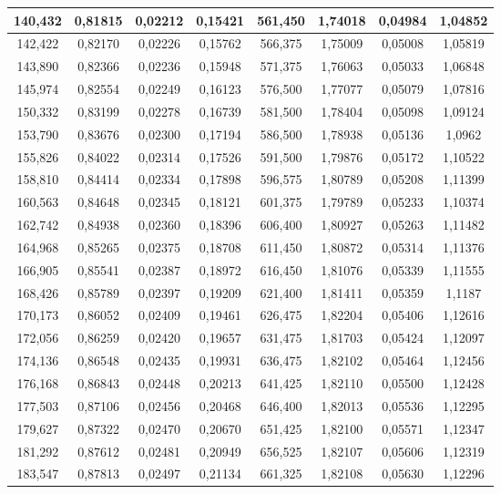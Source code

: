 \documentclass[a4paper,12pt]{article}
\numberwithin{equation}{section}
\begin{document}
\begin{appendices}
\begin{longtable}[c]{|c|c|c|c|c|c|c|c|}
140,432	&	0,81815	&	0,02212	&	0,15421	&	561,450	&	1,74018	&	0,04984	&	1,04852	\\\hline
142,422	&	0,82170	&	0,02226	&	0,15762	&	566,375	&	1,75009	&	0,05008	&	1,05819	\\\hline
143,890	&	0,82366	&	0,02236	&	0,15948	&	571,375	&	1,76063	&	0,05033	&	1,06848	\\\hline
145,974	&	0,82554	&	0,02249	&	0,16123	&	576,500	&	1,77077	&	0,05079	&	1,07816	\\\hline
150,332	&	0,83199	&	0,02278	&	0,16739	&	581,500	&	1,78404	&	0,05098	&	1,09124	\\\hline
153,790	&	0,83676	&	0,02300	&	0,17194	&	586,500	&	1,78938	&	0,05136	&	1,0962	\\\hline
155,826	&	0,84022	&	0,02314	&	0,17526	&	591,500	&	1,79876	&	0,05172	&	1,10522	\\\hline
158,810	&	0,84414	&	0,02334	&	0,17898	&	596,575	&	1,80789	&	0,05208	&	1,11399	\\\hline
160,563	&	0,84648	&	0,02345	&	0,18121	&	601,375	&	1,79789	&	0,05233	&	1,10374	\\\hline
162,742	&	0,84938	&	0,02360	&	0,18396	&	606,400	&	1,80927	&	0,05263	&	1,11482	\\\hline
164,968	&	0,85265	&	0,02375	&	0,18708	&	611,450	&	1,80872	&	0,05314	&	1,11376	\\\hline
166,905	&	0,85541	&	0,02387	&	0,18972	&	616,450	&	1,81076	&	0,05339	&	1,11555	\\\hline
168,426	&	0,85789	&	0,02397	&	0,19209	&	621,400	&	1,81411	&	0,05359	&	1,1187	\\\hline
170,173	&	0,86052	&	0,02409	&	0,19461	&	626,475	&	1,82204	&	0,05406	&	1,12616	\\\hline
172,056	&	0,86259	&	0,02420	&	0,19657	&	631,475	&	1,81703	&	0,05424	&	1,12097	\\\hline
174,136	&	0,86548	&	0,02435	&	0,19931	&	636,475	&	1,82102	&	0,05464	&	1,12456	\\\hline
176,168	&	0,86843	&	0,02448	&	0,20213	&	641,425	&	1,82110	&	0,05500	&	1,12428	\\\hline
177,503	&	0,87106	&	0,02456	&	0,20468	&	646,400	&	1,82013	&	0,05536	&	1,12295	\\\hline
179,627	&	0,87322	&	0,02470	&	0,20670	&	651,425	&	1,82100	&	0,05571	&	1,12347	\\\hline
181,292	&	0,87612	&	0,02481	&	0,20949	&	656,525	&	1,82107	&	0,05606	&	1,12319	\\\hline
183,547	&	0,87813	&	0,02497	&	0,21134	&	661,325	&	1,82108	&	0,05630	&	1,12296	\\\hline

\end{longtable}
\end{appendices}
\end{document}
